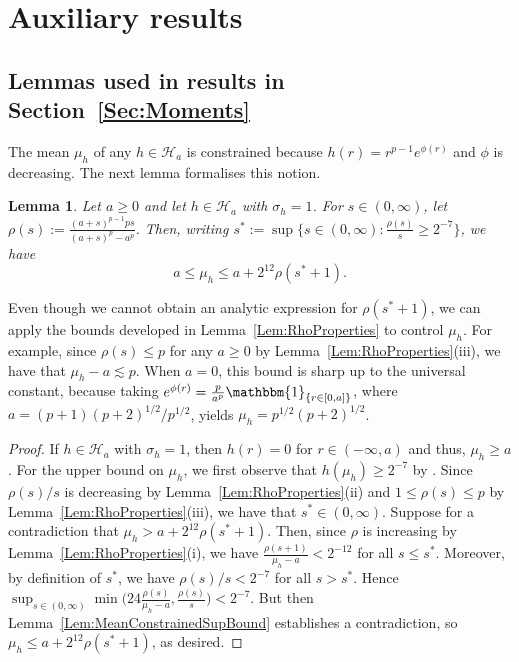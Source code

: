 \documentclass[a4paper,12pt]{article}
\newtheorem{lemma}[theorem]{Lemma}
\newenvironment{remark}[1][Remark:]{\begin{trivlist}
\item[\hskip \labelsep {\bfseries #1}]}{\end{trivlist}}
\begin{document}
\section{Auxiliary results}

\subsection{Lemmas used in results in Section~\ref{Sec:Moments}} 

The mean $\mu_h$ of any $h \in \mathcal{H}_a$ is constrained because $h(r) = r^{p-1}e^{\phi(r)}$ and $\phi$ is decreasing. The next lemma formalises this notion.
\begin{lemma}
  \label{Prop:UnitVarianceMeanBound}
  Let $a \geq 0$ and let $h \in \mathcal{H}_{a}$ with $\sigma_h = 1$.  For $s \in (0,\infty)$, let $\rho(s) := \frac{(a + s)^{p-1} p s}{(a + s)^p - a^p}$.  Then, writing $s^* := \sup \{ s \in (0,\infty) : \frac{\rho(s)}{s} \geq 2^{-7} \}$, we have
\[
a \leq \mu_h \leq a + 2^{12} \rho(s^*+1).
\]
\end{lemma}
\begin{remark}
Even though we cannot obtain an analytic expression for $\rho(s^*+1)$, we can apply the bounds developed in Lemma~\ref{Lem:RhoProperties} to control $\mu_h$.  For example, since $\rho(s) \leq p$ for any $a \geq 0$ by Lemma~\ref{Lem:RhoProperties}(iii), we have that $\mu_h - a \lesssim p$. When $a = 0$, this bound is sharp up to the universal constant, because taking $e^{\phi(r)} = \frac{p}{a^p}\mathbbm{1}_{\{r \in [0,a]\}}$, where $a = (p+1)(p+2)^{1/2}/p^{1/2}$, yields $\mu_h = p^{1/2}(p+2)^{1/2}$. 
\end{remark}
\begin{proof}
If $h \in \mathcal{H}_{a}$ with $\sigma_h = 1$, then $h(r) = 0$ for $r \in (-\infty, a)$ and thus, $\mu_h \geq a$.  For the upper bound on $\mu_h$, we first observe that $h(\mu_h) \geq 2^{-7}$ by \citet[][Theorem~5.14(d)]{lovasz2007geometry}.  Since $\rho(s)/s$ is decreasing by Lemma~\ref{Lem:RhoProperties}(ii) and $1 \leq \rho(s) \leq p$ by Lemma~\ref{Lem:RhoProperties}(iii), we have that $s^* \in (0,\infty)$.  Suppose for a contradiction that $\mu_h > a + 2^{12}\rho(s^*+1)$.  Then, since $\rho$ is increasing  by Lemma~\ref{Lem:RhoProperties}(i), we have $\frac{\rho(s + 1)}{\mu_h - a} < 2^{-12}$ for all $s \leq s^*$. Moreover, by definition of $s^*$, we have $\rho(s)/s < 2^{-7}$ for all $s > s^*$. Hence $\sup_{s \in (0,\infty)} \min \bigl( 24 \frac{\rho(s)}{\mu_h - a}, \frac{\rho(s)}{s} \bigr) < 2^{-7}$.  But then Lemma~\ref{Lem:MeanConstrainedSupBound} establishes a contradiction, so $\mu_h \leq a + 2^{12} \rho(s^*+1)$, as desired.  
\end{proof}
\end{document}
